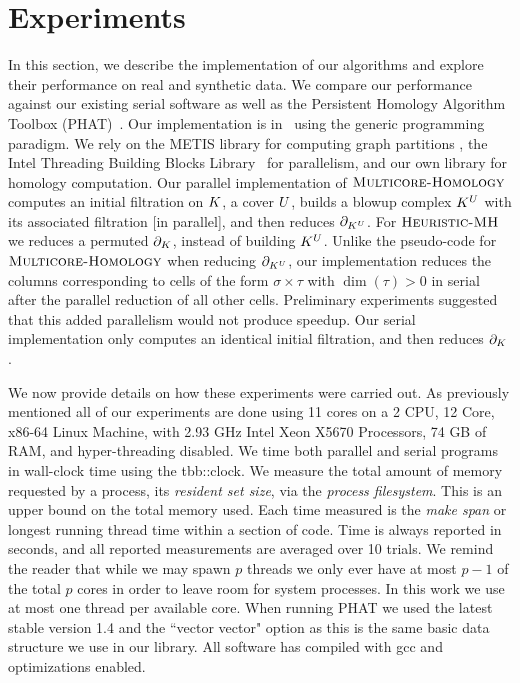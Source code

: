 \section{Experiments}

\label{sec:exp}
In this section, we describe the implementation of our algorithms
and explore their performance on real and synthetic data. We compare our
performance against our existing serial software as well as the Persistent Homology Algorithm Toolbox (PHAT)~\cite{bkr-cccph-13}. 
Our implementation is in \cplusplus\, using the generic programming paradigm. 
We rely on the METIS library for computing graph partitions 
\cite{KaKu95}, the Intel Threading Building Blocks 
Library~\cite{IntelTBB} for parallelism, and our own
library for homology computation. Our parallel implementation of $\textnormal{\scshape Multicore-Homology}$ computes
an initial filtration on $K$, a cover $U$, builds a blowup complex $K^{U}$ 
with its associated filtration [in parallel], and then reduces $\partial_{K^{U}}$.
For $\textnormal{\scshape Heuristic-MH}$ we reduces a permuted $\partial_K$, instead of building $K^{U}$.
Unlike the pseudo-code for $\textnormal{\scshape Multicore-Homology}$ when reducing $\partial_{K^{U}}$,
our implementation reduces the columns corresponding to cells of the form $\sigma \times \tau$ with $\dim{(\tau)} > 0$ in serial
after the parallel reduction of all other cells. Preliminary experiments suggested that
this added parallelism would not produce speedup. Our serial implementation only 
computes an identical initial filtration, and then reduces $\partial_K$.

We now provide details on how these experiments were carried out.
As previously mentioned all of our experiments are done 
using 11 cores on a 2 CPU, 12 Core, x86-64 Linux Machine, with 2.93 GHz Intel 
Xeon X5670 Processors, 74 GB of RAM, and hyper-threading disabled.
We time both parallel and serial programs in wall-clock time using the tbb::clock. 
We measure the total amount of memory requested by a process, its \emph{resident set size},
via the \emph{process filesystem}. This is an upper bound on the total memory used.  
Each time measured is the \emph{make span} or longest running thread time within a section of code. 
Time is always reported in seconds, and all reported measurements are averaged over 10 trials.
We remind the reader that while we may spawn $p$ threads we only ever have at most $p-1$ of the total $p$ cores 
in order to leave room for system processes. In this work we use at most one thread per available 
core. When running PHAT we used the latest stable version 1.4 and the ``vector vector" option as 
this is the same basic data structure we use in our library. All software has compiled with gcc and optimizations
enabled.

